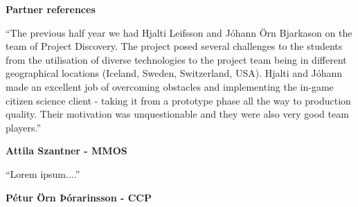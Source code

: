 {\Large
\textbf{Partner references}}

\vspace{0.4cm}

``The previous half year we had Hjalti Leifsson and Jóhann Örn Bjarkason on the team of Project Discovery. The project posed several challenges to the students from the utilisation of diverse technologies to the project team being in different geographical locations (Iceland, Sweden, Switzerland, USA). Hjalti and Jóhann made an excellent job of overcoming obstacles and implementing the in-game citizen science client - taking it from a prototype phase all the way to production quality. Their motivation was unquestionable and they were also very good team players.''

\begin{flushright}
\textbf{Attila Szantner - MMOS}
\end{flushright}


\vspace{1.0cm}

``Lorem ipsum....''

\begin{flushright}
\textbf{Pétur Örn Þórarinsson - CCP}
\end{flushright}